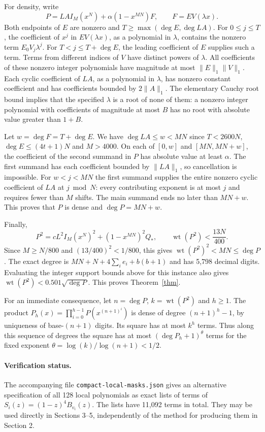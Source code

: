 \documentclass[11pt]{article}
\newcommand{\wt}{\operatorname{wt}}
\begin{document}
For density, write
\[
 P=LA I_M(x^N)+\alpha(1-x^{MN})F,\qquad F=E V(\lambda x).
\]
Both endpoints of $E$ are nonzero and $T\geq\max(\deg E,\deg LA)$. For $0\leq j\leq T$, the coefficient of $x^j$ in $EV(\lambda x)$, as a polynomial in $\lambda$, contains the nonzero term $E_0V_j\lambda^j$. For $T<j\leq T+\deg E$, the leading coefficient of $E$ supplies such a term. Terms from different indices of $V$ have distinct powers of $\lambda$. All coefficients of these nonzero integer polynomials have magnitude at most $\|E\|_1\|V\|_1$. Each cyclic coefficient of $LA$, as a polynomial in $\lambda$, has nonzero constant coefficient and has coefficients bounded by $2\|A\|_1$. The elementary Cauchy root bound implies that the specified $\lambda$ is a root of none of them: a nonzero integer polynomial with coefficients of magnitude at most $B$ has no root with absolute value greater than $1+B$.

Let $w=\deg F=T+\deg E$. We have $\deg LA\leq w<MN$ since $T<2600N$, $\deg E\leq(4t+1)N$ and $M>4000$. On each of $[0,w]$ and $[MN,MN+w]$, the coefficient of the second summand in $P$ has absolute value at least $\alpha$. The first summand has each coefficient bounded by $\|LA\|_1$, so cancellation is impossible. For $w<j<MN$ the first summand supplies the entire nonzero cyclic coefficient of $LA$ at $j\bmod N$: every contributing exponent is at most $j$ and requires fewer than $M$ shifts. The main summand ends no later than $MN+w$. This proves that $P$ is dense and $\deg P=MN+w$.

Finally,
\[
 P^2=cL^2 I_M(x^N)^2+(1-x^{MN})^2Q_*,
 \qquad
 \wt(P^2)<\frac{13N}{400}.
\]
Since $M\geq N/800$ and $(13/400)^2<1/800$, this gives $\wt(P^2)^2<MN\leq\deg P$. The exact degree is $MN+N+4\sum_i e_i+b(b+1)$ and has 5,798 decimal digits. Evaluating the integer support bounds above for this instance also gives $\wt(P^2)<0.501\sqrt{\deg P}$. This proves Theorem~\ref{thm}.

For an immediate consequence, let $n=\deg P$, $k=\wt(P^2)$ and $h\geq1$. The product $P_h(x)=\prod_{i=0}^{h-1}P(x^{(n+1)^i})$ is dense of degree $(n+1)^h-1$, by uniqueness of base-$(n+1)$ digits. Its square has at most $k^h$ terms. Thus along this sequence of degrees the square has at most $(\deg P_h+1)^\theta$ terms for the fixed exponent $\theta=\log(k)/\log(n+1)<1/2$.

\paragraph{Verification status.}
The accompanying file \texttt{compact-local-masks.json} gives an alternative specification of all 128 local polynomials as exact lists of terms of $S_i(z)=(1-z)^4 B_{v_i}(z)$. The lists have 11,092 terms in total. They may be used directly in Sections 3--5, independently of the method for producing them in Section 2.
\end{document}
